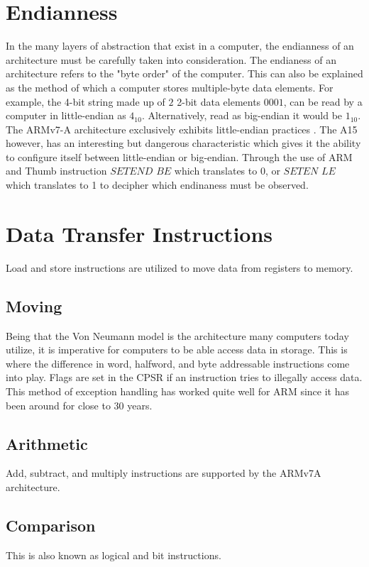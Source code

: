 \documentclass[12pt]{scrreprt}
\begin{document}
	\section{Endianness}
	In the many layers of abstraction that exist in a computer, the endianness of an architecture must be carefully taken into consideration.
	The endianess of an architecture refers to the "byte order" of the computer.
	This can also be explained as the method of which a computer stores multiple-byte data elements.
	For example, the 4-bit string made up of $2$ 2-bit data elements $0001$, can be read by a computer in little-endian as $4_{10}$. 
	Alternatively, read as big-endian it would be $1_{10}$.
	The ARMv7-A architecture exclusively exhibits little-endian practices \autocite[A2-53]{a7man}.
	The A15 however, has an interesting but dangerous characteristic which gives it the ability to configure itself between little-endian or big-endian.
	Through the use of ARM and Thumb instruction $SETEND$ $BE$ which translates to 0, or $SETEN$ $LE$ which translates to 1 to decipher which endinaness must be observed.

	\section{Data Transfer Instructions}
	Load and store instructions are utilized to move data from registers to memory.

	\subsection{Moving}
	Being that the Von Neumann model is the architecture many computers today utilize, it is imperative for computers to be able access data in storage.
	This is where the difference in word, halfword, and byte addressable instructions come into play.
	Flags are set in the CPSR if an instruction tries to illegally access data.
	This method of exception handling has worked quite well for ARM since it has been around for close to 30 years.

	\subsection{Arithmetic}
		Add, subtract, and multiply instructions are supported by the ARMv7A architecture.
	\subsection{Comparison}
		This is also known as logical and bit instructions.
\end{document}
